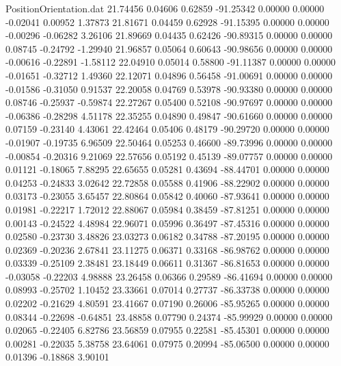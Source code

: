 \begin{filecontents}{PositionOrientation.dat}
  21.74456    0.04606    0.62859   -91.25342    0.00000    0.00000   -0.02041    0.00952    1.37873
  21.81671    0.04459    0.62928   -91.15395    0.00000    0.00000   -0.00296   -0.06282    3.26106
  21.89669    0.04435    0.62426   -90.89315    0.00000    0.00000    0.08745   -0.24792   -1.29940
  21.96857    0.05064    0.60643   -90.98656    0.00000    0.00000   -0.00616   -0.22891   -1.58112
  22.04910    0.05014    0.58800   -91.11387    0.00000    0.00000   -0.01651   -0.32712    1.49360
  22.12071    0.04896    0.56458   -91.00691    0.00000    0.00000   -0.01586   -0.31050    0.91537
  22.20058    0.04769    0.53978   -90.93380    0.00000    0.00000    0.08746   -0.25937   -0.59874
  22.27267    0.05400    0.52108   -90.97697    0.00000    0.00000   -0.06386   -0.28298    4.51178
  22.35255    0.04890    0.49847   -90.61660    0.00000    0.00000    0.07159   -0.23140    4.43061
  22.42464    0.05406    0.48179   -90.29720    0.00000    0.00000   -0.01907   -0.19735    6.96509
  22.50464    0.05253    0.46600   -89.73996    0.00000    0.00000   -0.00854   -0.20316    9.21069
  22.57656    0.05192    0.45139   -89.07757    0.00000    0.00000    0.01121   -0.18065    7.88295
  22.65655    0.05281    0.43694   -88.44701    0.00000    0.00000    0.04253   -0.24833    3.02642
  22.72858    0.05588    0.41906   -88.22902    0.00000    0.00000    0.03173   -0.23055    3.65457
  22.80864    0.05842    0.40060   -87.93641    0.00000    0.00000    0.01981   -0.22217    1.72012
  22.88067    0.05984    0.38459   -87.81251    0.00000    0.00000    0.00143   -0.24522    4.48984
  22.96071    0.05996    0.36497   -87.45316    0.00000    0.00000    0.02580   -0.23730    3.48826
  23.03273    0.06182    0.34788   -87.20195    0.00000    0.00000    0.02369   -0.20236    2.67841
  23.11275    0.06371    0.33168   -86.98762    0.00000    0.00000    0.03339   -0.25109    2.38481
  23.18449    0.06611    0.31367   -86.81653    0.00000    0.00000   -0.03058   -0.22203    4.98888
  23.26458    0.06366    0.29589   -86.41694    0.00000    0.00000    0.08993   -0.25702    1.10452
  23.33661    0.07014    0.27737   -86.33738    0.00000    0.00000    0.02202   -0.21629    4.80591
  23.41667    0.07190    0.26006   -85.95265    0.00000    0.00000    0.08344   -0.22698   -0.64851
  23.48858    0.07790    0.24374   -85.99929    0.00000    0.00000    0.02065   -0.22405    6.82786
  23.56859    0.07955    0.22581   -85.45301    0.00000    0.00000    0.00281   -0.22035    5.38758
  23.64061    0.07975    0.20994   -85.06500    0.00000    0.00000    0.01396   -0.18868    3.90101

\end{filecontents}
